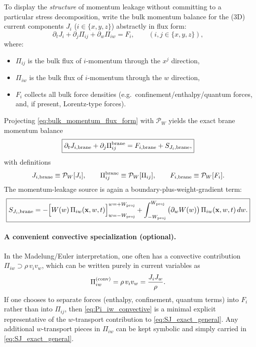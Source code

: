 \documentclass[11pt]{article}
\begin{document}
To display the \emph{structure} of momentum leakage without committing to a particular
stress decomposition, write the bulk momentum balance for the (3D) current components
$J_i$ ($i\in\{x,y,z\}$) abstractly in flux form:
\begin{equation}
\partial_t J_i + \partial_j \Pi_{ij} + \partial_w \Pi_{iw}
=
F_i,
\qquad (i,j\in\{x,y,z\}),
\label{eq:bulk_momentum_flux_form}
\end{equation}
where:
\begin{itemize}
\item $\Pi_{ij}$ is the bulk flux of $i$-momentum through the $x^j$ direction,
\item $\Pi_{iw}$ is the bulk flux of $i$-momentum through the $w$ direction,
\item $F_i$ collects all bulk force densities (e.g.\ confinement/enthalpy/quantum forces,
and, if present, Lorentz-type forces).
\end{itemize}

Projecting \eqref{eq:bulk_momentum_flux_form} with $\mathcal{P}_W$ yields the exact brane momentum balance
\begin{equation}
\boxed{
\partial_t J_{i,{\rm brane}} + \partial_j \Pi^{\rm brane}_{ij}
=
F_{i,{\rm brane}} + S_{J_i,{\rm brane}},
}
\label{eq:brane_momentum_exact}
\end{equation}
with definitions
\begin{equation}
J_{i,{\rm brane}}\equiv \mathcal{P}_W[J_i],
\qquad
\Pi^{\rm brane}_{ij}\equiv \mathcal{P}_W[\Pi_{ij}],
\qquad
F_{i,{\rm brane}}\equiv \mathcal{P}_W[F_i].
\label{eq:brane_momentum_defs}
\end{equation}
The momentum-leakage source is again a boundary-plus-weight-gradient term:
\begin{equation}
\boxed{
S_{J_i,{\rm brane}}
=
-\Big[ W(w)\,\Pi_{iw}(\mathbf{x},w,t)\Big]_{w=-W_{\rm proj}}^{w=+W_{\rm proj}}
+
\int_{-W_{\rm proj}}^{W_{\rm proj}} \big(\partial_w W(w)\big)\,\Pi_{iw}(\mathbf{x},w,t)\,dw.
}
\label{eq:SJ_exact_general}
\end{equation}

\paragraph{A convenient convective specialization (optional).}
In the Madelung/Euler interpretation, one often has a convective contribution
$\Pi_{iw}\supset \rho\,v_i v_w$, which can be written purely in current variables as
\begin{equation}
\Pi_{iw}^{\rm(conv)}=\rho\,v_i v_w=\frac{J_i J_w}{\rho}.
\label{eq:Pi_iw_convective}
\end{equation}
If one chooses to separate forces (enthalpy, confinement, quantum terms) into $F_i$
rather than into $\Pi_{ij}$, then \eqref{eq:Pi_iw_convective} is a minimal explicit
representative of the $w$-transport contribution to \eqref{eq:SJ_exact_general}.
Any additional $w$-transport pieces in $\Pi_{iw}$ can be kept symbolic and simply
carried in \eqref{eq:SJ_exact_general}.
\end{document}
